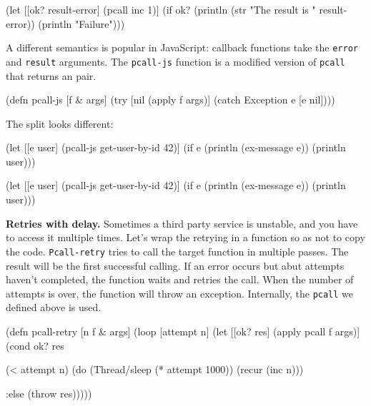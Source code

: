 \else

\begin{clojure}
(let [[ok? result-error] (pcall inc 1)]
  (if ok?
    (println (str "The result is " result-error))
    (println "Failure")))
\end{clojure}

\fi


A different semantics is popular in JavaScript: callback functions take the \verb|error| and \verb|result| arguments. The \verb|pcall-js| function is a modified version of \verb|pcall| that returns an  pair.

\begin{clojure}
(defn pcall-js [f & args]
  (try
    [nil (apply f args)]
    (catch Exception e [e nil])))
\end{clojure}

\noindent
The split looks different:

\ifx\DEVICETYPE\MOBILE

\begin{clojure}
(let [[e user]
      (pcall-js get-user-by-id 42)]
  (if e
    (println (ex-message e))
    (println user)))
\end{clojure}

\else

\begin{clojure}
(let [[e user] (pcall-js get-user-by-id 42)]
  (if e
    (println (ex-message e))
    (println user)))
\end{clojure}

\fi


\textbf{ Retries with delay.} Sometimes a third party service is unstable, and you have to access it multiple times. Let's wrap the retrying in a function so as not to copy the code. \verb|Pcall-retry| tries to call the target function in multiple passes. The result will be the first successful calling. If an error occurs but abut attempts haven't completed, the function waits and retries the call. When the number of attempts is over, the function will throw an exception.
Internally, the \verb|pcall| we defined above is used.


\ifx\DEVICETYPE\MOBILE

\begin{clojure}
(defn pcall-retry [n f & args]
  (loop [attempt n]
    (let [[ok? res] (apply pcall f args)]
      (cond
        ok? res

        (< attempt n)
        (do (Thread/sleep
              (* attempt 1000))
            (recur (inc n)))

        :else (throw res)))))
\end{clojure}

